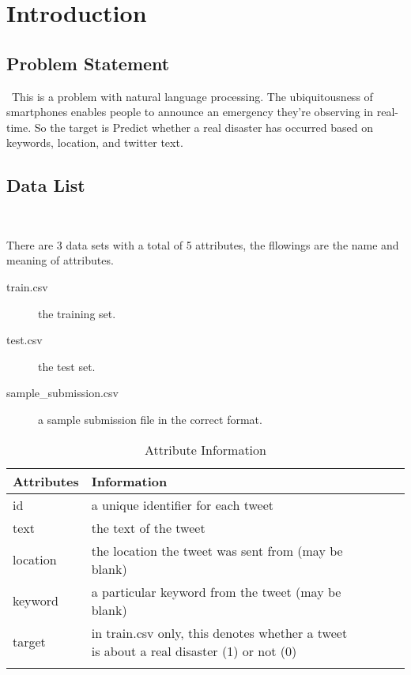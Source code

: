 
\section{Introduction}\label{sec-intro}

\subsection{Problem Statement}
\
This is a problem with natural language processing.
The ubiquitousness of smartphones enables 
people to announce an emergency they’re 
observing in real-time. So the target is
Predict whether a real disaster has occurred 
based on keywords, location, and twitter text.

\subsection{Data List}
\

There are 3 data sets with a total of 5 attributes,
the fllowings are the  
name and meaning of attributes.


\begin{description}
	\item[train.csv] the training set.
	\item[test.csv] the test set.
	\item[sample\_submission.csv] a sample submission file in the correct format.
\end{description}

\begin{table}[htbp]
	\centering
	\caption{Attribute Information}
	\begin{tabular}{llllll}
		\hline
		Attributes & Information                                                                            \\
		\hline
		id   & a unique identifier for each tweet                                                               \\
		text    & the text of the tweet                                                                         \\
		location     & the location the tweet was sent from (may be blank)                                      \\
		keyword     & a particular keyword from the tweet (may be blank)                                        \\
		target    &  in train.csv only, this denotes whether a tweet is about a real disaster (1) or not (0)    \\                                               \\
		\hline
	\end{tabular}
\end{table}

